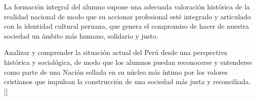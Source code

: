 \begin{syllabus}


\begin{justification}
La formación integral del alumno supone una adecuada valoración histórica de la realidad nacional de modo que su accionar profesional esté integrado y articulado con la identidad cultural peruana, que genera el compromiso de hacer de nuestra sociedad un ámbito más humano, solidario y justo.
\end{justification}

\begin{goals}
\item Analizar y comprender la situación actual del Perú desde una perspectiva histórica y sociológica, de modo que los alumnos puedan reconocerse y entenderse como parte de una Nación sellada en su núcleo más íntimo por los valores cristianos que impulsan la construcción de una sociedad más justa y reconciliada.  [\Familiarity]
\end{goals}



\end{syllabus}
